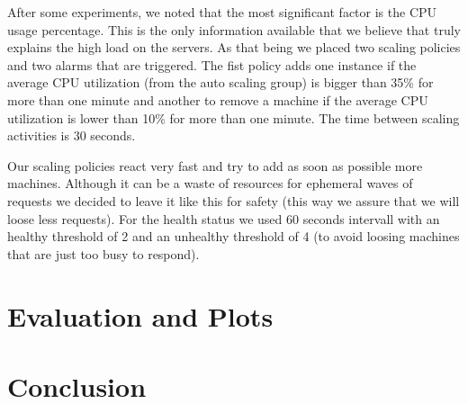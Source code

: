 \documentclass{article}
\begin{document}
After some experiments, we noted that the most significant factor is the CPU usage percentage. This is the only information available that we believe that truly explains the high load on the servers. As that being we placed two scaling policies and two alarms that are triggered. The fist policy adds one instance if the average CPU utilization (from the auto scaling group) is bigger than 35\% for more than one minute and another to remove a machine if the average CPU utilization is lower than 10\% for more than one minute. The time between scaling activities is 30 seconds.

Our scaling policies react very fast and try to add as soon as possible more machines. Although it can be a waste of resources for ephemeral waves of requests we decided to leave it like this for safety (this way we assure that we will loose less requests). For the health status we used 60 seconds intervall with an healthy threshold of 2 and an unhealthy threshold of 4 (to avoid loosing machines that are just too busy to respond). 

\section{Evaluation and Plots}

\section{Conclusion}
\end{document}
